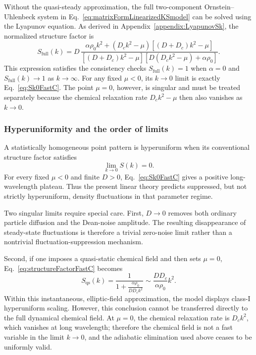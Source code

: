 \documentclass{article}
\begin{document}
Without the quasi-steady approximation, the full two-component Ornstein--Uhlenbeck system in Eq.~\eqref{eq:matrixFormLinearizedKSmodel} can be solved using the Lyapunov equation. As derived in Appendix~\ref{appendix:LyapunovSk}, the normalized structure factor is
\begin{equation}
    \boxed{
    S_{\mathrm{full}}(k)=
    D\,
    \frac{\alpha\rho_0k^2+(D_ck^2-\mu)\left[(D+D_c)k^2-\mu\right]}
    {\left[(D+D_c)k^2-\mu\right]\left[D(D_ck^2-\mu)+\alpha\rho_0\right]}
    }.
    \label{eq:SkFullMain}
\end{equation}
This expression satisfies the consistency checks $S_{\mathrm{full}}(k)=1$ when $\alpha=0$ and $S_{\mathrm{full}}(k)\to1$ as $k\to\infty$. For any fixed $\mu<0$, its $k\to0$ limit is exactly Eq.~\eqref{eq:Sk0FastC}. The point $\mu=0$, however, is singular and must be treated separately because the chemical relaxation rate $D_ck^2-\mu$ then also vanishes as $k\to0$.

\subsubsection{Hyperuniformity and the order of limits}

A statistically homogeneous point pattern is hyperuniform when its conventional structure factor satisfies
\begin{equation}
    \lim_{k\to0}S(k)=0.
\end{equation}
For every fixed $\mu<0$ and finite $D>0$, Eq.~\eqref{eq:Sk0FastC} gives a positive long-wavelength plateau. Thus the present linear theory predicts suppressed, but not strictly hyperuniform, density fluctuations in that parameter regime.

Two singular limits require special care. First, $D\to0$ removes both ordinary particle diffusion and the Dean-noise amplitude. The resulting disappearance of steady-state fluctuations is therefore a trivial zero-noise limit rather than a nontrivial fluctuation-suppression mechanism.

Second, if one imposes a quasi-static chemical field and then sets $\mu=0$, Eq.~\eqref{eq:structureFactorFastC} becomes
\begin{equation}
    S_{\mathrm{qs}}(k)
    =\frac{1}{1+\frac{\alpha \rho _0}{DD_ck^2}}
    {\sim}\frac{DD_c}{\alpha\rho_0}k^2.
    \label{eq:SkQuasiStaticMuZero}
\end{equation}
Within this instantaneous, elliptic-field approximation, the model displays class-I hyperuniform scaling. However, this conclusion cannot be transferred directly to the full dynamical chemical field. At $\mu=0$, the chemical relaxation rate is $D_ck^2$, which vanishes at long wavelength; therefore the chemical field is not a fast variable in the limit $k\to0$, and the adiabatic elimination used above ceases to be uniformly valid.
\end{document}
